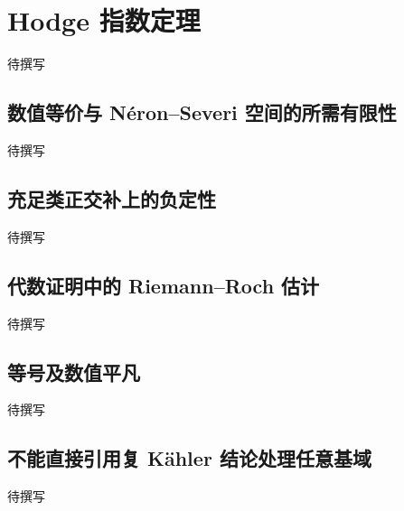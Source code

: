 
% 
% 
% 
% 

\section{Hodge 指数定理}
\label{g5:sec:2504}

待撰写

\subsection{数值等价与 Néron–Severi 空间的所需有限性}
\label{g5:subsec:2504:01}
待撰写

\subsection{充足类正交补上的负定性}
\label{g5:subsec:2504:02}
待撰写

\subsection{代数证明中的 Riemann–Roch 估计}
\label{g5:subsec:2504:03}
待撰写

\subsection{等号及数值平凡}
\label{g5:subsec:2504:04}
待撰写

\subsection{不能直接引用复 Kähler 结论处理任意基域}
\label{g5:subsec:2504:05}
待撰写

